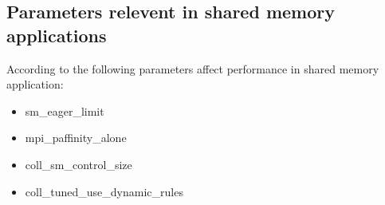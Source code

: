 \documentclass[thesis.tex]{subfiles}
\begin{document}
\subsection{Parameters relevent in shared memory applications}
According to \cite{machinelearning} the following parameters affect performance in shared memory application:
\begin{itemize}
\item sm\_eager\_limit
\item mpi\_paffinity\_alone
\item coll\_sm\_control\_size
\item coll\_tuned\_use\_dynamic\_rules
\end{itemize}
\end{document}
